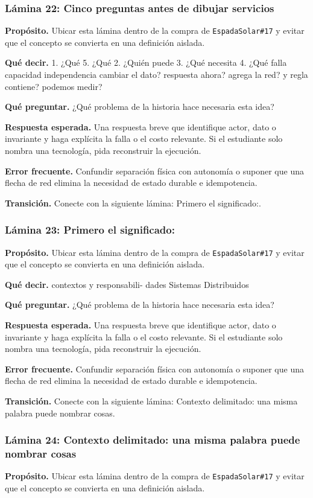 \documentclass[variant=docente,cover=institutional,mode=screen]{ua-engineering-v6-article}
\begin{document}
\subsubsection*{Lámina 22: Cinco preguntas antes de dibujar servicios}
\textbf{Propósito.} Ubicar esta lámina dentro de la compra de \texttt{EspadaSolar\#17} y evitar que el concepto se convierta en una definición aislada.

\textbf{Qué decir.} 1. ¿Qué 5. ¿Qué 2. ¿Quién puede 3. ¿Qué necesita 4. ¿Qué falla capacidad independencia cambiar el dato? respuesta ahora? agrega la red? y regla contiene? podemos medir?

\textbf{Qué preguntar.} ¿Qué problema de la historia hace necesaria esta idea?

\textbf{Respuesta esperada.} Una respuesta breve que identifique actor, dato o invariante y haga explícita la falla o el costo relevante. Si el estudiante solo nombra una tecnología, pida reconstruir la ejecución.

\textbf{Error frecuente.} Confundir separación física con autonomía o suponer que una flecha de red elimina la necesidad de estado durable e idempotencia.

\textbf{Transición.} Conecte con la siguiente lámina: Primero el significado:.

\subsubsection*{Lámina 23: Primero el significado:}
\textbf{Propósito.} Ubicar esta lámina dentro de la compra de \texttt{EspadaSolar\#17} y evitar que el concepto se convierta en una definición aislada.

\textbf{Qué decir.} contextos y responsabili- dades Sistemas Distribuidos

\textbf{Qué preguntar.} ¿Qué problema de la historia hace necesaria esta idea?

\textbf{Respuesta esperada.} Una respuesta breve que identifique actor, dato o invariante y haga explícita la falla o el costo relevante. Si el estudiante solo nombra una tecnología, pida reconstruir la ejecución.

\textbf{Error frecuente.} Confundir separación física con autonomía o suponer que una flecha de red elimina la necesidad de estado durable e idempotencia.

\textbf{Transición.} Conecte con la siguiente lámina: Contexto delimitado: una misma palabra puede nombrar cosas.

\subsubsection*{Lámina 24: Contexto delimitado: una misma palabra puede nombrar cosas}
\textbf{Propósito.} Ubicar esta lámina dentro de la compra de \texttt{EspadaSolar\#17} y evitar que el concepto se convierta en una definición aislada.
\end{document}
